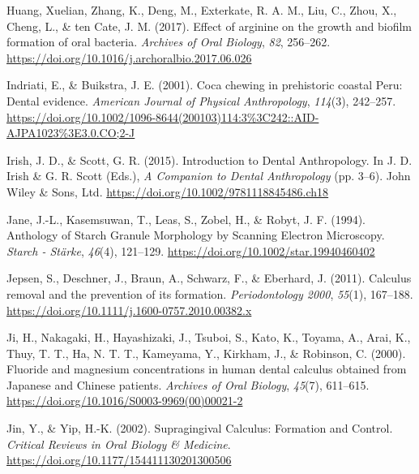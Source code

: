 \documentclass[
  letterpaper,
]{book}
\newlength{\cslhangindent}
\newlength{\cslentryspacingunit} %
\newenvironment{CSLReferences}[2] %
 {%
  \setlength{\parindent}{0pt}
  \ifodd #1
  \let\oldpar\par
  \def\par{\hangindent=\cslhangindent\oldpar}
  \fi
  \setlength{\parskip}{#2\cslentryspacingunit}
 }%
 {}
\begin{document}
\begin{CSLReferences}{1}{0}
\leavevmode{}%
Huang, Xuelian, Zhang, K., Deng, M., Exterkate, R. A. M., Liu, C., Zhou,
X., Cheng, L., \& ten Cate, J. M. (2017). Effect of arginine on the
growth and biofilm formation of oral bacteria. \emph{Archives of Oral
Biology}, \emph{82}, 256--262.
\url{https://doi.org/10.1016/j.archoralbio.2017.06.026}

\leavevmode{}%
Indriati, E., \& Buikstra, J. E. (2001). Coca chewing in prehistoric
coastal {Peru}: {Dental} evidence. \emph{American Journal of Physical
Anthropology}, \emph{114}(3), 242--257.
\url{https://doi.org/10.1002/1096-8644(200103)114:3\%3C242::AID-AJPA1023\%3E3.0.CO;2-J}

\leavevmode{}%
Irish, J. D., \& Scott, G. R. (2015). Introduction to {Dental
Anthropology}. In J. D. Irish \& G. R. Scott (Eds.), \emph{A {Companion}
to {Dental Anthropology}} (pp. 3--6). {John Wiley \& Sons, Ltd}.
\url{https://doi.org/10.1002/9781118845486.ch18}

\leavevmode{}%
Jane, J.-L., Kasemsuwan, T., Leas, S., Zobel, H., \& Robyt, J. F.
(1994). Anthology of {Starch Granule Morphology} by {Scanning Electron
Microscopy}. \emph{Starch - Stärke}, \emph{46}(4), 121--129.
\url{https://doi.org/10.1002/star.19940460402}

\leavevmode{}%
Jepsen, S., Deschner, J., Braun, A., Schwarz, F., \& Eberhard, J.
(2011). Calculus removal and the prevention of its formation.
\emph{Periodontology 2000}, \emph{55}(1), 167--188.
\url{https://doi.org/10.1111/j.1600-0757.2010.00382.x}

\leavevmode{}%
Ji, H., Nakagaki, H., Hayashizaki, J., Tsuboi, S., Kato, K., Toyama, A.,
Arai, K., Thuy, T. T., Ha, N. T. T., Kameyama, Y., Kirkham, J., \&
Robinson, C. (2000). Fluoride and magnesium concentrations in human
dental calculus obtained from {Japanese} and {Chinese} patients.
\emph{Archives of Oral Biology}, \emph{45}(7), 611--615.
\url{https://doi.org/10.1016/S0003-9969(00)00021-2}

\leavevmode{}%
Jin, Y., \& Yip, H.-K. (2002). Supragingival {Calculus}: {Formation} and
{Control}. \emph{Critical Reviews in Oral Biology \& Medicine}.
\url{https://doi.org/10.1177/154411130201300506}


\end{CSLReferences}
\end{document}
